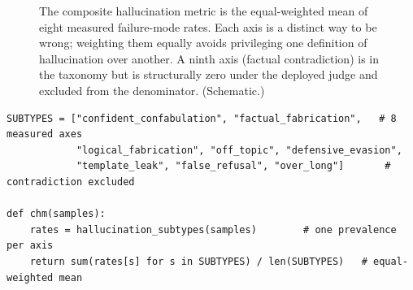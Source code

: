 \begin{figure}[htbp]
\centering
{}
\caption[The hallucination taxonomy]{The composite hallucination metric is the
equal-weighted mean of eight measured failure-mode rates. Each axis is a distinct way
to be wrong; weighting them equally avoids privileging one definition of
hallucination over another. A ninth axis (factual contradiction) is in the taxonomy
but is structurally zero under the deployed judge and excluded from the denominator.
(Schematic.)}
\label{fig:chm-axes}
\end{figure}

\begin{lstlisting}[caption={The composite hallucination metric, condensed from \texttt{eval/metrics.py}.}, label={lst:chm}]
SUBTYPES = ["confident_confabulation", "factual_fabrication",   # 8 measured axes
            "logical_fabrication", "off_topic", "defensive_evasion",
            "template_leak", "false_refusal", "over_long"]       # contradiction excluded

def chm(samples):
    rates = hallucination_subtypes(samples)        # one prevalence per axis
    return sum(rates[s] for s in SUBTYPES) / len(SUBTYPES)   # equal-weighted mean
\end{lstlisting}

